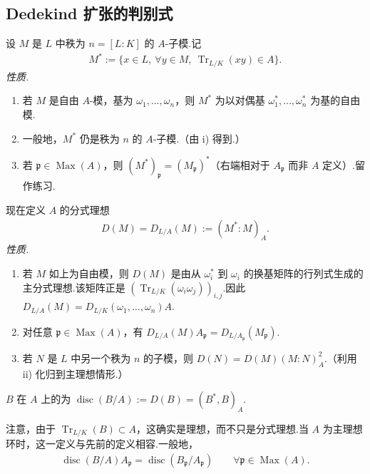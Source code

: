 \subsection{Dedekind 扩张的判别式}\label{sec:nt-3-4-2}
设 $M$ 是 $L$ 中秩为 $n=[L:K]$ 的 $A$-子模.记
\begin{align*}
M^*:=\{x\in L,\ \forall y\in M,\ \operatorname{Tr}_{L/K}(xy)\in A\}.
\end{align*}
\emph{性质.}
\begin{enumerate}[label=\roman*)]
\item 若 $M$ 是自由 $A$-模，基为 $\omega_1,\ldots,\omega_n$，则 $M^*$ 为以对偶基 $\omega_1^*,\ldots,\omega_n^*$ 为基的自由模.
\item 一般地，$M^*$ 仍是秩为 $n$ 的 $A$-子模.（由 i) 得到.）
\item 若 $\mathfrak p\in\operatorname{Max}(A)$，则 $(M^*)_{\mathfrak p}=(M_{\mathfrak p})^*$（右端相对于 $A_{\mathfrak p}$ 而非 $A$ 定义）.留作练习.
\end{enumerate}
现在定义 $A$ 的分式理想
\begin{align*}
D(M)=D_{L/A}(M):=(M^*:M)_A.
\end{align*}
\emph{性质.}
\begin{enumerate}[label=\roman*)]
\item 若 $M$ 如上为自由模，则 $D(M)$ 是由从 $\omega_i^*$ 到 $\omega_i$ 的换基矩阵的行列式生成的主分式理想.该矩阵正是 $(\operatorname{Tr}_{L/K}(\omega_i\omega_j))_{i,j}$.因此 $D_{L/A}(M)=D_{L/K}(\omega_1,\ldots,\omega_n)A$.
\item 对任意 $\mathfrak p\in\operatorname{Max}(A)$，有 $D_{L/A}(M)A_{\mathfrak p}=D_{L/A_{\mathfrak p}}(M_{\mathfrak p})$.
\item 若 $N$ 是 $L$ 中另一个秩为 $n$ 的子模，则 $D(N)=D(M)(M:N)_A^2$.（利用 ii) 化归到主理想情形.）
\end{enumerate}
\begin{definition*}
$B$ 在 $A$ 上的为 $\operatorname{disc}(B/A):=D(B)=(B^*,B)_A$.
\end{definition*}
注意，由于 $\operatorname{Tr}_{L/K}(B)\subset A$，这确实是理想，而不只是分式理想.当 $A$ 为主理想环时，这一定义与先前的定义相容.一般地，
\begin{align*}
\operatorname{disc}(B/A)A_{\mathfrak p}=\operatorname{disc}(B_{\mathfrak p}/A_{\mathfrak p})\qquad\forall\mathfrak p\in\operatorname{Max}(A).
\end{align*}

